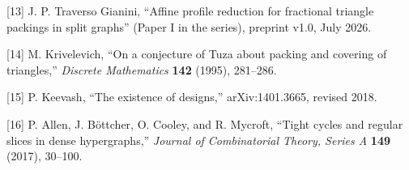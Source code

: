 \documentclass[
  11pt,
]{article}
\begin{document}
{[}13{]} J. P. Traverso Gianini, ``Affine profile reduction for fractional triangle packings in split graphs'' (Paper I in the series), preprint v1.0, July 2026.

{[}14{]} M. Krivelevich, ``On a conjecture of Tuza about packing and covering of triangles,'' \emph{Discrete Mathematics} \textbf{142} (1995), 281--286.

{[}15{]} P. Keevash, ``The existence of designs,'' arXiv:1401.3665, revised 2018.

{[}16{]} P. Allen, J. Böttcher, O. Cooley, and R. Mycroft, ``Tight cycles and regular slices in dense hypergraphs,'' \emph{Journal of Combinatorial Theory, Series A} \textbf{149} (2017), 30--100.
\end{document}
